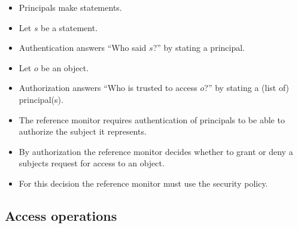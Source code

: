 \begin{frame}
  \begin{definition}[Authentication]
    \begin{itemize}
      \item Principals make statements.

      \item Let \(s\) be a statement.

      \item Authentication answers \enquote{Who said \(s\)?} by stating 
        a principal.
    \end{itemize}
  \end{definition}

  \pause{}

  \begin{definition}[Authorization]
    \begin{itemize}
      \item Let \(o\) be an object.

      \item Authorization answers \enquote{Who is trusted to access \(o\)?} by 
        stating a (list of) principal(s).
    \end{itemize}
  \end{definition}
\end{frame}

\begin{frame}
  \begin{idea}
    \begin{itemize}
      \item The reference monitor requires authentication of principals to be 
        able to authorize the subject it represents.

      \item By authorization the reference monitor decides whether to grant or 
        deny a subjects request for access to an object.

      \item For this decision the reference monitor must use the security policy.
    \end{itemize}
  \end{idea}
\end{frame}


\subsection{Access operations}


